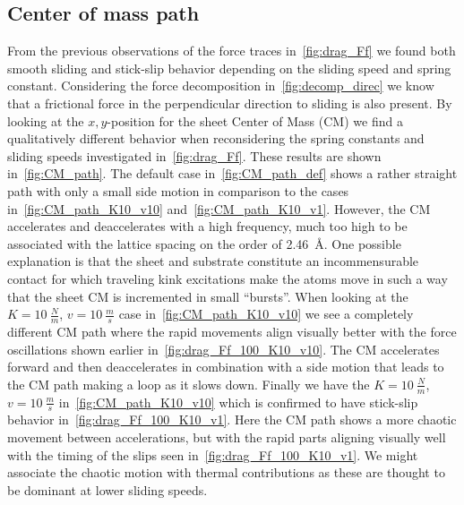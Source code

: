 \subsection{Center of mass path}
From the previous observations of the force traces in~\cref{fig:drag_Ff} we found both smooth sliding and stick-slip behavior depending on the sliding speed and spring constant. Considering the force
decomposition in~\cref{fig:decomp_direc} we know that a frictional force in
the perpendicular direction to sliding is also present. By looking at the
$x,y$-position for the sheet Center of Mass (\acrshort{CM}) we find a qualitatively different behavior when reconsidering the spring constants and sliding speeds investigated in~\cref{fig:drag_Ff}. These results are shown in~\cref{fig:CM_path}. The default case in~\cref{fig:CM_path_def} shows a rather straight path with
only a small side motion in comparison to the cases in~\cref{fig:CM_path_K10_v10} and~\cref{fig:CM_path_K10_v1}. However, the \acrshort{CM} accelerates and deaccelerates with a high frequency, much too high
to be associated with the lattice spacing on the order of \SI{2.46}{Å}. One possible explanation is that the sheet and substrate
constitute an incommensurable contact for which traveling kink excitations make
the atoms move in such a way that the sheet \acrshort{CM} is incremented in small ``bursts''. When looking at the $K = \SI{10}{\frac{N}{m}}$, $v =
\SI{10}{\frac{m}{s}}$ case in~\cref{fig:CM_path_K10_v10} we see a completely
different \acrshort{CM} path where the rapid movements align visually better with
the force oscillations shown earlier in~\cref{fig:drag_Ff_100_K10_v10}. The
\acrshort{CM} accelerates forward and then deaccelerates in combination with a
side motion that leads to the \acrshort{CM} path making a loop as it slows down.
Finally we have the $K = \SI{10}{\frac{N}{m}}$, $v = \SI{10}{\frac{m}{s}}$ in~\cref{fig:CM_path_K10_v10} which is confirmed to have stick-slip behavior in~\cref{fig:drag_Ff_100_K10_v1}. Here the \acrshort{CM} path shows a more chaotic
movement between accelerations, but with the rapid parts aligning visually well with the timing of the slips seen in~\cref{fig:drag_Ff_100_K10_v1}. We might associate the chaotic motion with thermal contributions as these are thought to be dominant at lower sliding speeds.  


